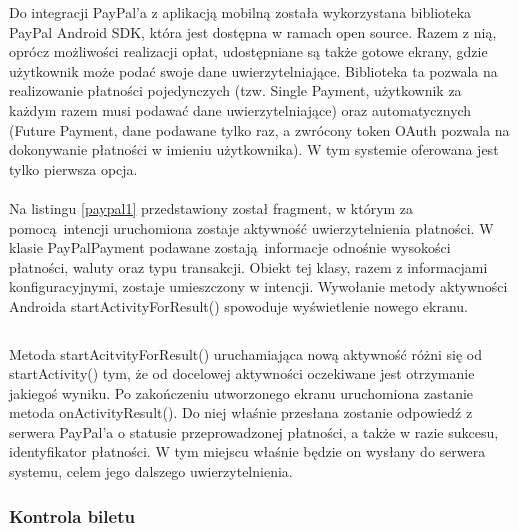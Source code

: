 Do integracji PayPal'a z aplikacją mobilną została wykorzystana biblioteka PayPal Android SDK, która jest dostępna w ramach open source. Razem z nią, oprócz możliwości realizacji opłat, udostępniane są także gotowe ekrany, gdzie użytkownik może podać swoje dane uwierzytelniające. Biblioteka ta pozwala na realizowanie płatności pojedynczych (tzw. Single Payment, użytkownik za każdym razem musi podawać dane uwierzytelniające) oraz automatycznych (Future Payment, dane podawane tylko raz, a zwrócony token OAuth pozwala na dokonywanie płatności w imieniu użytkownika). W tym systemie oferowana jest tylko pierwsza opcja.
\\
\\
Na listingu \ref{paypal1} przedstawiony został fragment, w którym za pomocą intencji uruchomiona zostaje aktywność uwierzytelnienia płatności. W klasie PayPalPayment podawane zostają informacje odnośnie wysokości płatności, waluty oraz typu transakcji. Obiekt tej klasy, razem z informacjami konfiguracyjnymi, zostaje umieszczony w intencji. Wywołanie metody aktywności Androida startActivityForResult() spowoduje wyświetlenie nowego ekranu.

\begin{singlespace}
	\label{paypal1}
	\vspace{0.3cm}
	\inputminted[fontsize=\footnotesize, linenos=true]{java}{src/imp/get-payment.java}
\end{singlespace}

Metoda startAcitvityForResult() uruchamiająca nową aktywność różni się od startActivity() tym, że od docelowej aktywności oczekiwane jest otrzymanie jakiegoś wyniku. Po zakończeniu utworzonego ekranu uruchomiona zastanie metoda onActivityResult(). Do niej właśnie przesłana zostanie odpowiedź z serwera PayPal'a o statusie przeprowadzonej płatności, a także w razie sukcesu, identyfikator płatności. W tym miejscu właśnie będzie on wysłany do serwera systemu, celem jego dalszego uwierzytelnienia.


\subsubsection*{Kontrola biletu}

